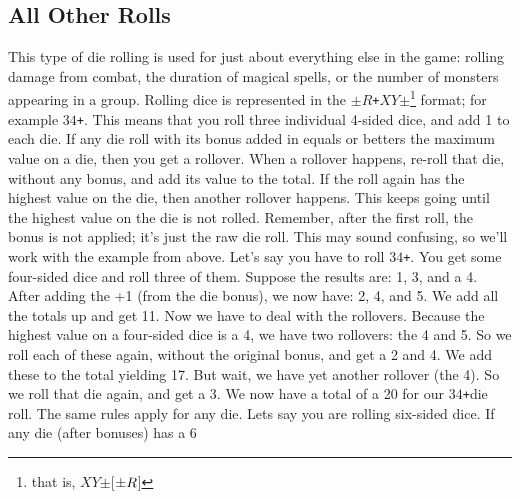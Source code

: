 \documentclass[twoside]{book}
\begin{document}
\subsection{All Other Rolls}
     This type of die rolling is used for just about
               everything else in the game: rolling damage from combat,
               the duration of magical spells, or the number of monsters
               appearing in a group.  Rolling dice is represented in the
                \texttt{\ensuremath{\pm}}\ensuremath{R}\texttt{+}\ensuremath{X}\ensuremath{Y}\texttt{\ensuremath{\pm}}\footnote{ that is,
                \ensuremath{X}\ensuremath{Y}\texttt{\ensuremath{\pm}}[\ensuremath{\texttt{\ensuremath{\pm}}\ensuremath{R}}]} format; for
               example \ensuremath{3}\ensuremath{4}\texttt{+}. This means that you roll three individual
               4-sided dice, and add 1 to each die.  If any die roll with its bonus added in equals or
               betters the maximum value on a die, then you get a
               rollover. When a rollover happens, re-roll that die,
               without any bonus, and add its value to the total. If the
               roll again has the highest value on the die, then another
               rollover happens. This keeps going until the highest value
               on the die is not rolled. Remember, after the first roll,
               the bonus is not applied; it's just the raw die
               roll.  This may sound confusing, so we'll work with
               the example from above. Let's say you have to roll
               \ensuremath{3}\ensuremath{4}\texttt{+}. You get some four-sided dice and roll three of
               them. Suppose the results are: 1, 3, and a 4. After adding
               the +1 (from the die bonus), we now have: 2, 4, and 5. We
               add all the totals up and get 11. Now we have to deal with
               the rollovers. Because the highest value on a four-sided
               dice is a 4, we have two rollovers: the 4 and 5. So we
               roll each of these again, without the original bonus, and
               get a 2 and 4. We add these to the total yielding 17. But
               wait, we have yet another rollover (the 4). So we roll
               that die again, and get a 3. We now have a total of a 20
               for our \ensuremath{3}\ensuremath{4}\texttt{+}die roll.  The same rules apply for any die. Lets say you are
               rolling six-sided dice. If any die (after bonuses) has a 6
\end{document}
